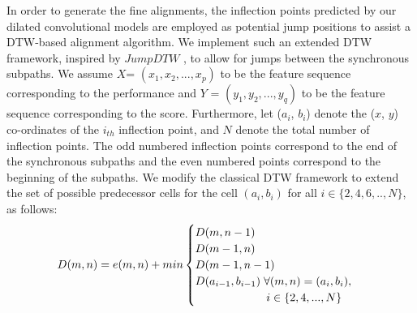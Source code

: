 \documentclass{article}
\begin{document}
 \par In order to generate the fine alignments, the inflection points predicted by our dilated convolutional models are employed as potential jump positions to assist a DTW-based alignment algorithm. We implement such an extended DTW framework, inspired by \begin{math}\textit{JumpDTW}\end{math}  \cite{Fremerey2010handling}, to allow for jumps between the synchronous subpaths.  
We assume $X$= $(x_1, x_2,..., x_p)$ to be the feature sequence corresponding to the performance and $Y$ = $(y_1, y_2,..., y_q)$ to be the feature sequence corresponding to the score. Furthermore, let ($a_i$, $b_i$) denote the ($x$, $y$) co-ordinates of the $i_{th}$ inflection point, and $N$ denote the total number of inflection points. The odd numbered inflection points correspond to the end of the synchronous subpaths and the even numbered points correspond to the beginning of the subpaths. We modify the classical DTW framework to extend the set of possible predecessor cells for the cell $(a_i, b_i)$ for all \begin{math} i \in \{2, 4, 6, .., N\} \end{math}, as follows:
\vspace{-0.2cm}
\begin{equation}
D(m, n)  = e(m, n) + min\begin{cases}
D(m, n-1) \\ D(m-1, n) \\  D(m-1,  n-1) \\
D(a_{i-1}, b_{i-1}) \hspace{0.1cm} \forall (m, n) = (a_i, b_i),\\ 
\hspace{2.2cm} i \in \{2, 4, ..., N\}
\end{cases}
\end{equation}
\begin{comment}
\begin{adjustbox}{max width=\columnwidth}
\begin{equation}
$D(m, n)  = e(m, n) + min$\begin{cases}
D(m, n-1) \\ D(m-1, n) \\  D(m-1,  n-1) \\
D(a_{i-1}, b_{i-1}) \hspace{0.1cm} \forall m=a_i, i \in \{2, 4, ..., N\}
\end{cases}
\end{equation}
\end{adjustbox}
\end{comment}
\end{document}
